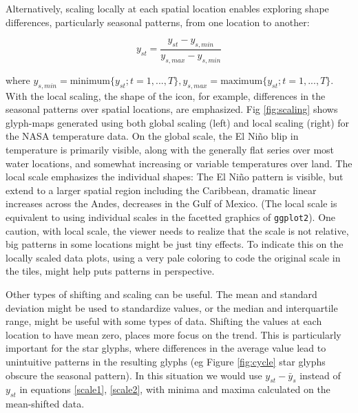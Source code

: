 \documentclass[oneside]{article}
\begin{document}
Alternatively, scaling locally at each spatial location enables exploring shape differences, particularly seasonal patterns, from one location to another:

\begin{equation}
y_{st} = \frac{y_{st}-y_{s,min}}{y_{s,max}-y_{s,min}} %
\label{scale2}
\end{equation}

\noindent where $y_{s, min} = \mbox{minimum}\{y_{st}; t=1, ..., T \}, y_{s,max} = \mbox{maximum}\{y_{st}; t=1, ..., T\}$. With the local scaling, the shape of the icon, for example, differences in the seasonal patterns over spatial locations, are emphasized.  Fig \ref{fig:scaling} shows glyph-maps generated using both global scaling (left) and local scaling (right) for the NASA temperature data. On the global scale, the El Ni\~no blip in temperature is primarily visible, along with the generally flat series over most water locations, and somewhat increasing or variable temperatures over land. The local scale emphasizes the individual shapes: The El Ni\~no pattern is visible, but extend to a larger spatial region including the Caribbean, dramatic linear increases across the Andes, decreases in the Gulf of Mexico. (The local scale is equivalent to using individual scales in the facetted graphics of \texttt{ggplot2}). One caution, with local scale, the viewer needs to realize that the scale is not relative, big patterns in some locations might be just tiny effects. To indicate this on the locally scaled data plots, using a very pale coloring to code the original scale in the tiles, might help puts patterns in perspective.

Other types of shifting and scaling can be useful. The mean and standard deviation might be used to standardize values, or the median and interquartile range, might be useful with some types of data. Shifting the values at each location to have mean zero, places more focus on the trend. This is particularly important for the star glyphs, where differences in the average value lead to unintuitive patterns in the resulting glyphs (eg Figure \ref{fig:cycle} star glyphs obscure the seasonal pattern).  In this situation we would use $y_{st}-\bar{y}_s$ instead of $y_{st}$ in equations \ref{scale1}, \ref{scale2}, with minima and maxima calculated on the mean-shifted data.

\end{document}
